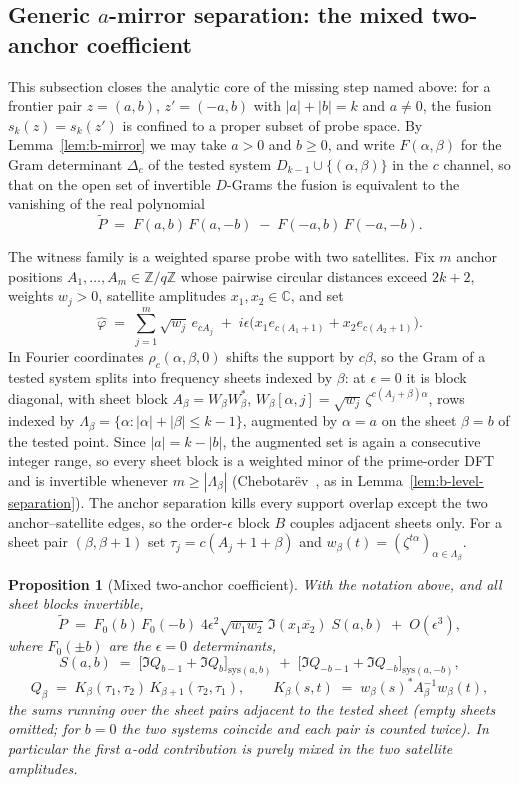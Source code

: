 \documentclass[11pt]{article}
\newtheorem{proposition}{Proposition}
\newcommand{\Zq}{\mathbb{Z}/q\mathbb{Z}}
\begin{document}
\subsection{Generic $a$-mirror separation: the mixed two-anchor coefficient}
\label{sec:amirror}

This subsection closes the analytic core of the missing step named above: for a frontier pair
$z=(a,b)$, $z'=(-a,b)$ with $|a|+|b|=k$ and $a\neq0$, the fusion $s_k(z)=s_k(z')$ is confined to a
proper subset of probe space.
By Lemma~\ref{lem:b-mirror} we may take $a>0$ and $b\ge0$, and write $F(\alpha,\beta)$ for the Gram
determinant $\Delta_c$ of the tested system $D_{k-1}\cup\{(\alpha,\beta)\}$ in the $c$ channel, so
that on the open set of invertible $D$-Grams the fusion is equivalent to the vanishing of the real
polynomial
\[
\widetilde P \;=\; F(a,b)\,F(a,-b)\;-\;F(-a,b)\,F(-a,-b).
\]

The witness family is a weighted sparse probe with two satellites.
Fix $m$ anchor positions $A_1,\dots,A_m\in\Zq$ whose pairwise circular distances exceed $2k+2$,
weights $w_j>0$, satellite amplitudes $x_1,x_2\in\mathbb{C}$, and set
\[
\widehat\varphi
\;=\;
\sum_{j=1}^{m}\sqrt{w_j}\,e_{cA_j}
\;+\;
i\epsilon\bigl(x_1 e_{c(A_1+1)}+x_2 e_{c(A_2+1)}\bigr).
\]
In Fourier coordinates $\rho_c(\alpha,\beta,0)$ shifts the support by $c\beta$, so the Gram of a
tested system splits into frequency sheets indexed by $\beta$: at $\epsilon=0$ it is block diagonal,
with sheet block $A_\beta=W_\beta W_\beta^\ast$,
$W_\beta[\alpha,j]=\sqrt{w_j}\,\zeta^{c(A_j+\beta)\alpha}$, rows indexed by
$\Lambda_\beta=\{\alpha:|\alpha|+|\beta|\le k-1\}$, augmented by $\alpha=a$ on the sheet $\beta=b$
of the tested point.
Since $|a|=k-|b|$, the augmented set is again a consecutive integer range, so every sheet block is a
weighted minor of the prime-order DFT and is invertible whenever $m\ge|\Lambda_\beta|$
(Chebotar\"ev~\cite{EvansIsaacs1976}, as in Lemma~\ref{lem:b-level-separation}).
The anchor separation kills every support overlap except the two anchor--satellite edges, so the
order-$\epsilon$ block $B$ couples adjacent sheets only.
For a sheet pair $(\beta,\beta+1)$ set $\tau_j=c(A_j+1+\beta)$ and
$w_\beta(t)=(\zeta^{t\alpha})_{\alpha\in\Lambda_\beta}$.

\begin{proposition}[Mixed two-anchor coefficient]
\label{prop:mixed-two-anchor-coefficient}
With the notation above, and all sheet blocks invertible,
\[
\widetilde P
\;=\;
F_0(b)\,F_0(-b)\;4\epsilon^2\sqrt{w_1w_2}\,\Im(x_1\overline{x_2})\;S(a,b)
\;+\;O(\epsilon^3),
\]
where $F_0(\pm b)$ are the $\epsilon=0$ determinants,
\[
S(a,b)
\;=\;
\bigl[\Im Q_{b-1}+\Im Q_b\bigr]_{\mathrm{sys}(a,b)}
\;+\;
\bigl[\Im Q_{-b-1}+\Im Q_{-b}\bigr]_{\mathrm{sys}(a,-b)},
\]
\[
Q_\beta
\;=\;
K_\beta(\tau_1,\tau_2)\,K_{\beta+1}(\tau_2,\tau_1),
\qquad
K_\beta(s,t)
\;=\;
w_\beta(s)^\ast A_\beta^{-1}w_\beta(t),
\]
the sums running over the sheet pairs adjacent to the tested sheet (empty sheets omitted; for $b=0$
the two systems coincide and each pair is counted twice).
In particular the first $a$-odd contribution is purely mixed in the two satellite amplitudes.
\end{proposition}
\end{document}
